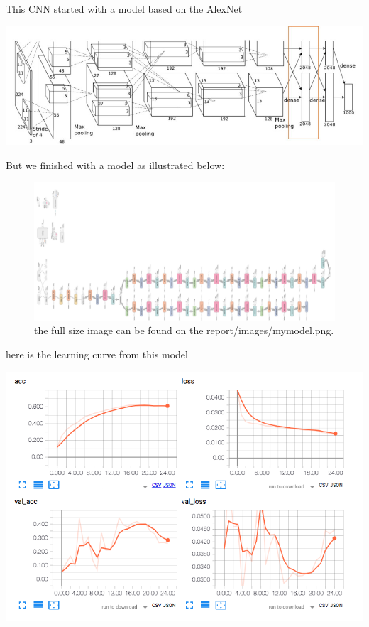 \documentclass[11pt]{article}
\begin{document}
This CNN started with a model based on the AlexNet \cite{krizhevsky2012imagenet} 
\begin{center}
\includegraphics[width=.9\linewidth]{./images/alexnet6.jpg}
\end{center}
But we finished with a model as illustrated below:
\begin{figure}[htbp]
\centering
\includegraphics[width=.9\linewidth]{./images/mymodel.png}
\caption{the full size image can be found on the report/images/mymodel.png.}
\end{figure}

here is the learning curve from this model
\begin{center}
\includegraphics[width=.9\linewidth]{./images/mymodelLoss.png}
\end{center}
\end{document}
